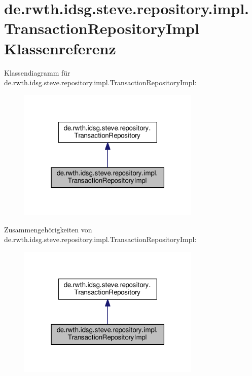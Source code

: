 \hypertarget{classde_1_1rwth_1_1idsg_1_1steve_1_1repository_1_1impl_1_1_transaction_repository_impl}{\section{de.\+rwth.\+idsg.\+steve.\+repository.\+impl.\+Transaction\+Repository\+Impl Klassenreferenz}
\label{classde_1_1rwth_1_1idsg_1_1steve_1_1repository_1_1impl_1_1_transaction_repository_impl}
}


Klassendiagramm für de.\+rwth.\+idsg.\+steve.\+repository.\+impl.\+Transaction\+Repository\+Impl\+:\nopagebreak
\begin{figure}[H]
\begin{center}
\leavevmode
\includegraphics[width=247pt]{classde_1_1rwth_1_1idsg_1_1steve_1_1repository_1_1impl_1_1_transaction_repository_impl__inherit__graph}
\end{center}
\end{figure}


Zusammengehörigkeiten von de.\+rwth.\+idsg.\+steve.\+repository.\+impl.\+Transaction\+Repository\+Impl\+:\nopagebreak
\begin{figure}[H]
\begin{center}
\leavevmode
\includegraphics[width=247pt]{classde_1_1rwth_1_1idsg_1_1steve_1_1repository_1_1impl_1_1_transaction_repository_impl__coll__graph}
\end{center}
\end{figure}
